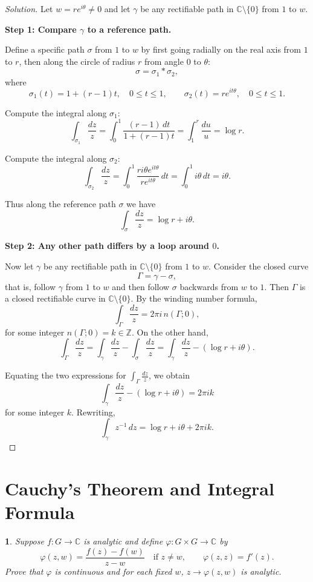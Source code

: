 \documentclass[12pt, a4paper]{report}
\theoremstyle{spaced}
\newtheorem{exercise}{}
\newcommand{\setexercise}[1]{\setcounter{exercise}{#1-1}}
\begin{document}
\begin{proof}[Solution]
	Let $w = r e^{i\theta} \neq 0$ and let $\gamma$ be any rectifiable path in
	$\mathbb{C} \setminus \{0\}$ from $1$ to $w$.

	\medskip
	\noindent\textbf{Step 1: Compare $\gamma$ to a reference path.}

	Define a specific path $\sigma$ from $1$ to $w$ by first going radially on the
	real axis from $1$ to $r$, then along the circle of radius $r$ from angle $0$
	to $\theta$:
	\[
		\sigma = \sigma_1 * \sigma_2,
	\]
	where
	\[
		\sigma_1(t) = 1 + (r-1)t, \quad 0 \le t \le 1,
		\qquad
		\sigma_2(t) = r e^{it\theta}, \quad 0 \le t \le 1.
	\]

	Compute the integral along $\sigma_1$:
	\[
		\int_{\sigma_1} \frac{dz}{z}
		= \int_0^1 \frac{(r-1)\,dt}{1+(r-1)t}
		= \int_1^r \frac{du}{u}
		= \log r.
	\]

	Compute the integral along $\sigma_2$:
	\[
		\int_{\sigma_2} \frac{dz}{z}
		= \int_0^1 \frac{r i\theta e^{it\theta}}{r e^{it\theta}}\,dt
		= \int_0^1 i\theta\,dt
		= i\theta.
	\]

	Thus along the reference path $\sigma$ we have
	\[
		\int_{\sigma} \frac{dz}{z}
		= \log r + i\theta.
	\]

	\medskip
	\noindent\textbf{Step 2: Any other path differs by a loop around $0$.}

	Now let $\gamma$ be any rectifiable path in $\mathbb{C}\setminus \{0\}$ from $1$ to $w$.
	Consider the closed curve
	\[
		\Gamma = \gamma - \sigma,
	\]
	that is, follow $\gamma$ from $1$ to $w$ and then follow $\sigma$ backwards from $w$ to $1$.
	Then $\Gamma$ is a closed rectifiable curve in $\mathbb{C}\setminus \{0\}$.
	By the winding number formula,
	\[
		\int_{\Gamma} \frac{dz}{z}
		= 2\pi i\, n(\Gamma;0),
	\]
	for some integer $n(\Gamma;0) = k \in \mathbb{Z}$.
	On the other hand,
	\[
		\int_{\Gamma} \frac{dz}{z}
		= \int_{\gamma} \frac{dz}{z}
		- \int_{\sigma} \frac{dz}{z}
		= \int_{\gamma} \frac{dz}{z}
		- (\log r + i\theta).
	\]

	Equating the two expressions for $\displaystyle \int_{\Gamma} \frac{dz}{z}$, we obtain
	\[
		\int_{\gamma} \frac{dz}{z}
		- (\log r + i\theta)
		= 2\pi i k
	\]
	for some integer $k$.
	Rewriting,
	\[
		\int_{\gamma} z^{-1}\,dz
		= \log r + i\theta + 2\pi i k.
	\]
\end{proof}

\section{Cauchy's Theorem and Integral Formula}
\setexercise{1}
\begin{exercise}
	Suppose $f : G \to \mathbb{C}$ is analytic and define $\varphi : G \times G \to \mathbb{C}$ by
	\[
		\varphi(z,w) = \frac{f(z) - f(w)}{\, z - w \,} \quad \text{if } z \neq w,
		\qquad
		\varphi(z,z) = f'(z).
	\]
	Prove that $\varphi$ is continuous and for each fixed \(w\), \(z \to \varphi(z,w)\)
	is analytic.
\end{exercise}
\end{document}
